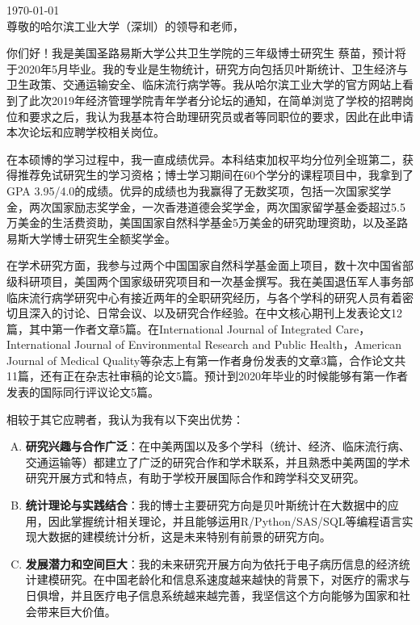 \documentclass[11pt, a4paper]{article}
\begin{document}

\today\\
尊敬的哈尔滨工业大学（深圳）的领导和老师，

\vspace*{\fill}

\setlength{\parindent}{24pt}%
你们好！我是美国圣路易斯大学公共卫生学院的三年级博士研究生 蔡苗，预计将于2020年5月毕业。我的专业是生物统计，研究方向包括贝叶斯统计、卫生经济与卫生政策、交通运输安全、临床流行病学等。我从哈尔滨工业大学的官方网站上看到了此次2019年经济管理学院青年学者分论坛的通知，在简单浏览了学校的招聘岗位和要求之后，我认为我基本符合助理研究员或者等同职位的要求，因此在此申请本次论坛和应聘学校相关岗位。

在本硕博的学习过程中，我一直成绩优异。本科结束加权平均分位列全班第二，获得推荐免试研究生的学习资格；博士学习期间在60个学分的课程项目中，我拿到了GPA 3.95/4.0的成绩。优异的成绩也为我赢得了无数奖项，包括一次国家奖学金，两次国家励志奖学金，一次香港道德会奖学金，两次国家留学基金委超过5.5万美金的生活费资助，美国国家自然科学基金5万美金的研究助理资助，以及圣路易斯大学博士研究生全额奖学金。

在学术研究方面，我参与过两个中国国家自然科学基金面上项目，数十次中国省部级科研项目，美国两个国家级研究项目和一次基金撰写。我在美国退伍军人事务部临床流行病学研究中心有接近两年的全职研究经历，与各个学科的研究人员有着密切且深入的讨论、日常会议、以及研究合作经验。在中文核心期刊上发表论文12篇，其中第一作者文章5篇。在International Journal of Integrated Care，International Journal of Environmental Research and Public Health，American Journal of Medical Quality等杂志上有第一作者身份发表的文章3篇，合作论文共11篇，还有正在杂志社审稿的论文5篇。预计到2020年毕业的时候能够有第一作者发表的国际同行评议论文5篇。

相较于其它应聘者，我认为我有以下突出优势：
\begin{enumerate}[(A)]
	\setlength{\parskip}{-0.2em}%
	\item \textbf{研究兴趣与合作广泛}：在中美两国以及多个学科（统计、经济、临床流行病、交通运输等）都建立了广泛的研究合作和学术联系，并且熟悉中美两国的学术研究开展方式和特点，有助于学校开展国际合作和跨学科交叉研究。
	\item \textbf{统计理论与实践结合}：我的博士主要研究方向是贝叶斯统计在大数据中的应用，因此掌握统计相关理论，并且能够运用R/Python/SAS/SQL等编程语言实现大数据的建模统计分析，这是未来特别有前景的研究方向。
	\item \textbf{发展潜力和空间巨大}：我的未来研究开展方向为依托于电子病历信息的经济统计建模研究。在中国老龄化和信息系速度越来越快的背景下，对医疗的需求与日俱增，并且医疗电子信息系统越来越完善，我坚信这个方向能够为国家和社会带来巨大价值。
\end{enumerate}
\end{document}
